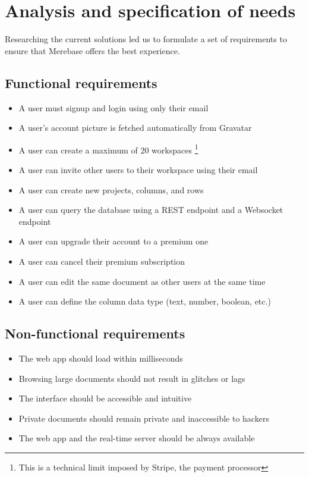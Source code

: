 \chapter{Analysis and specification of needs}
\label{chap:analysis}

\noindent Researching the current solutions led us to formulate a set of
requirements to ensure that Merebase offers the best experience.

\section{Functional requirements}

\begin{itemize}
	\item
	      A user must signup and login using only their email
	\item
	      A user's account picture is fetched automatically from Gravatar
	\item
	      A user can create a maximum of 20 workspaces \footnote{This is a
		      technical limit imposed by Stripe, the payment processor}
	\item
	      A user can invite other users to their workspace using their email
	\item
	      A user can create new projects, columns, and rows
	\item
	      A user can query the database using a REST endpoint and a Websocket
	      endpoint
	\item
	      A user can upgrade their account to a premium one
	\item
	      A user can cancel their premium subscription
	\item
	      A user can edit the same document as other users at the same time
	\item
	      A user can define the column data type (text, number, boolean, etc.)
\end{itemize}

\section{Non-functional
  requirements}

\begin{itemize}
	\item
	      The web app should load within milliseconds
	\item
	      Browsing large documents should not result in glitches or lags
	\item
	      The interface should be accessible and intuitive
	\item
	      Private documents should remain private and inaccessible to hackers
	\item
	      The web app and the real-time server should be always available
\end{itemize}

